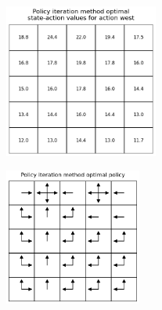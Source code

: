 \begin{homeworkProblem}
\begin{figure}[h]
    \includegraphics[width=0.45\textwidth]{./figure/p3_output/optimal/policy_iteration/Q_west.png}
    \vspace{-0.2cm}
\end{figure}
\begin{figure}[!htbp]
    \centering
    \includegraphics[width=0.4\textwidth]{./figure/p3_output/optimal/policy_iteration/policy.png}
\end{figure}

\end{homeworkProblem}

\newpage